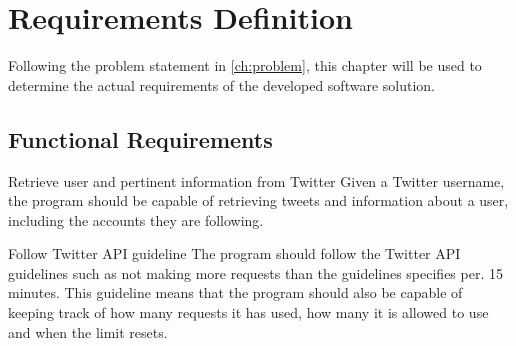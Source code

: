 \chapter{Requirements Definition}\label{cha:req}
Following the problem statement in \autoref{ch:problem}, this chapter will be
used to determine the actual requirements of the developed software solution.


\section{Functional Requirements}\label{sec:funcReq}

\begin{requirement}{Retrieve user and pertinent information from Twitter}
Given a Twitter username, the program should be capable of retrieving
tweets and information about a user, including the accounts they are following.
\end{requirement}

\begin{requirement}{Follow Twitter \ac{API} guideline} 
The program should follow the Twitter \ac{API} guidelines such as not making
more requests than the guidelines specifies per. 15 minutes. This guideline
means that the program should also be capable of keeping track of how many
requests it has used, how many it is allowed to use and when the limit resets. 
\end{requirement}

